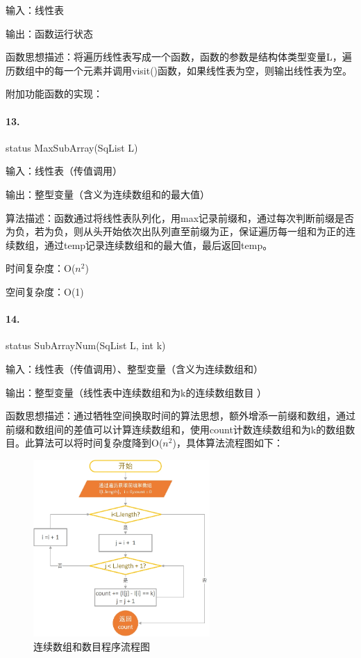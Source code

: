 \documentclass[supercite]{Experimental_Report}
\theoremstyle{definition}
\begin{document}
输入：线性表

输出：函数运行状态

函数思想描述：将遍历线性表写成一个函数，函数的参数是结构体类型变量L，遍历数组中的每一个元素并调用visit()函数，如果线性表为空，则输出线性表为空。


附加功能函数的实现：

\paragraph{13.}status MaxSubArray(SqList L)

输入：线性表（传值调用）

输出：整型变量（含义为连续数组和的最大值）

算法描述：函数通过将线性表队列化，用max记录前缀和，通过每次判断前缀是否为负，若为负，则从头开始依次出队列直至前缀为正，保证遍历每一组和为正的连续数组，通过temp记录连续数组和的最大值，最后返回temp。

时间复杂度：O($n^{2}$)

空间复杂度：O(1)

\paragraph{14.}status SubArrayNum(SqList L, int k)

输入：线性表（传值调用）、整型变量（含义为连续数组和）

输出：整型变量（线性表中连续数组和为k的连续数组数目 ）

函数思想描述：通过牺牲空间换取时间的算法思想，额外增添一前缀和数组，通过前缀和数组间的差值可以计算连续数组和，使用count计数连续数组和为k的数组数目。此算法可以将时间复杂度降到O($n^{2}$)，具体算法流程图如下：

 \begin{figure}[H]
 	\centering
 	\includegraphics[width=0.6\textwidth]{images/连续数组.jpg}
 	\caption{连续数组和数目程序流程图}
 	\label{txlab}
 \end{figure}
\end{document}

